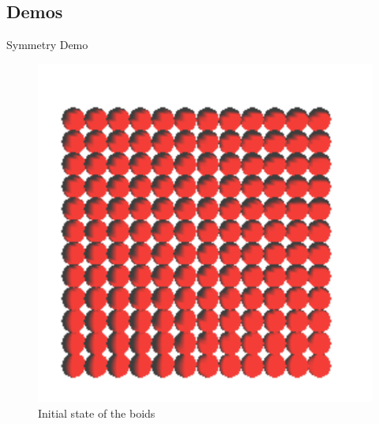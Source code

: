 \documentclass[red]{beamer}
\begin{document}
\subsection{Demos}

\begin{frame}{Symmetry Demo}
	\begin{figure}[htbp]
	\begin{center}
	\includegraphics[scale=0.35]{../figures/align.pdf}
	\caption{Initial state of the boids}
	\label{alignRule}
	\end{center}
	\end{figure}
\end{frame}
\end{document}
